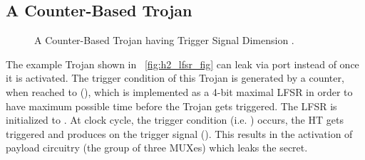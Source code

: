 \documentclass[10pt,journal,compsoc]{IEEEtran}
\begin{document}
\subsection{A Counter-Based  Trojan}\label{htd-h2}
\begin{figure}[!t]
\centering
{}
\hfill
{}
\caption{A Counter-Based  Trojan having Trigger Signal Dimension .}
\label{fig:h2_lfsr_ex}
\end{figure}

The example Trojan shown in \figurename~\ref{fig:h2_lfsr_fig} can leak  via  port instead of  once it is activated.
The trigger condition of this Trojan is generated by a counter, when reached to (), which is implemented as a 4-bit maximal LFSR in order to have maximum possible time before the Trojan gets triggered.
The LFSR is initialized to .
At  clock cycle, the trigger condition (i.e. ) occurs, the HT gets triggered and produces  on the trigger signal ().
This results in the activation of payload circuitry (the group of three MUXes) which leaks the secret.
\end{document}
